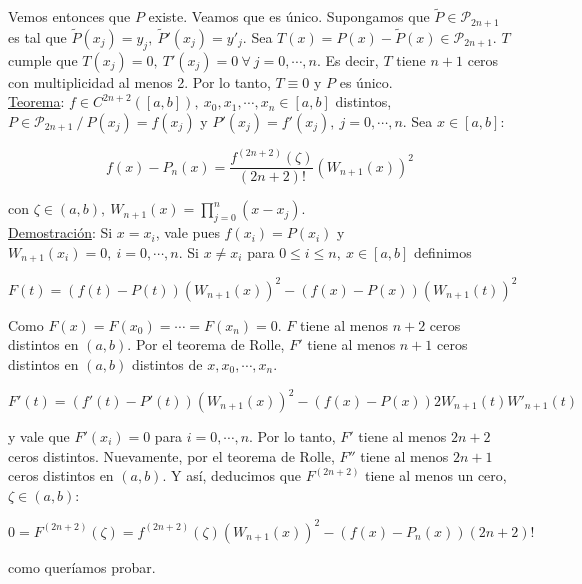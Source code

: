 Vemos entonces que $P$ existe. Veamos que es \'unico. Supongamos que $\tilde{P} \in \mathcal{P}_{2n + 1}$ es tal que $\tilde{P}(x_{j}) = y_{j},\ \tilde{P}'(x_{j}) = y'_{j}$. Sea $T(x) = P(x) - \tilde{P}(x) \in \mathcal{P}_{2n + 1}$. $T$ cumple que $T(x_{j}) = 0,\ T'(x_{j}) = 0\ \forall \ j = 0, \cdots, n$. Es decir, $T$ tiene $n + 1$ ceros con multiplicidad al menos 2. Por lo tanto, $T \equiv 0$ y $P$ es \'unico.\\

\underline{Teorema}: $f \in C^{2n + 2}([a, b]),\ x_{0}, x_{1}, \cdots, x_{n} \in [a, b]$ distintos, $P \in \mathcal{P}_{2n + 1}\ / \ P(x_{j}) = f(x_{j})$ y $P'(x_{j}) = f'(x_{j}),\ j = 0, \cdots, n$. Sea $x \in [a, b]$: 

$$f(x) - P_{n}(x) = \frac{f^{(2n + 2)}(\zeta)}{(2n + 2)!}(W_{n + 1}(x))^{2}$$

con $\zeta \in (a, b),\ W_{n + 1}(x) = \prod \limits_{j = 0}^{n} (x - x_{j})$.\\

\underline{Demostraci\'on}: Si $x = x_{i}$, vale pues $f(x_{i}) = P(x_{i})$ y $W_{n + 1}(x_{i}) = 0,\ i = 0, \cdots, n$. Si $x \neq x_{i}$ para $0 \leq i \leq n,\ x \in [a, b]$ definimos

$$F(t) = (f(t) - P(t))(W_{n + 1}(x))^{2} - (f(x) - P(x))(W_{n + 1}(t))^{2}$$

Como $F(x) = F(x_{0}) = \cdots = F(x_{n}) = 0$. $F$ tiene al menos $n + 2$ ceros distintos en $(a, b)$. Por el teorema de Rolle, $F'$ tiene al menos $n + 1$ ceros distintos en $(a, b)$ distintos de $x, x_{0}, \cdots, x_{n}$.

$$F'(t) = (f'(t) - P'(t))(W_{n + 1}(x))^{2} - (f(x) - P(x))2W_{n + 1}(t)W'_{n + 1}(t)$$

y vale que $F'(x_{i}) = 0$ para $i = 0, \cdots, n$. Por lo tanto, $F'$ tiene al menos $2n + 2$ ceros distintos. Nuevamente, por el teorema de Rolle, $F''$ tiene al menos $2n + 1$ ceros distintos en $(a, b)$. Y as\'i, deducimos que $F^{(2n + 2)}$ tiene al menos un cero, $\zeta \in (a, b)$:

$$0 = F^{(2n + 2)}(\zeta) = f^{(2n + 2)}(\zeta)(W_{n + 1}(x))^{2} - (f(x) - P_{n}(x))(2n + 2)!$$

como quer\'iamos probar.